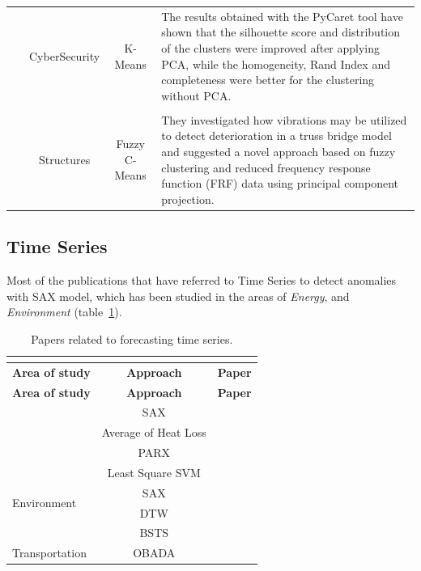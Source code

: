 \documentclass[a4paper,12pt,twoside]{ThesisStyle}
\begin{document}
\begin{landscape}
\begin{longtable}{  l  c  c  l  }
\\
\parbox{2.65cm}{~\cite{karanfilovska2022analysis}}  & CyberSecurity & K-Means & \parbox{12.5cm}{The results obtained with the PyCaret tool have shown that the silhouette score and distribution of the clusters were improved after applying PCA, while the homogeneity, Rand Index and completeness were better for the clustering without PCA.} \\
\\
\parbox{1cm}{~\cite{Zinno2022bridges}}  & Structures & Fuzzy C-Means & \parbox{12.5cm}{They investigated how vibrations may be utilized to detect deterioration in a truss bridge model and suggested a novel approach based on fuzzy clustering and reduced frequency response function (FRF) data using principal component projection.} \\
\hline
\end{longtable}
\end{landscape}

\subsection{Time Series}

Most of the publications that have referred to Time Series to detect anomalies with SAX model, which has been studied in the areas of \textit{Energy}, and \textit{Environment} (table~\ref{taula:PTSP}). 

\renewcommand{\arraystretch}{1.5}
\begin{longtable}{  l  c  l  }
\caption{Papers related to forecasting time series.}  \\
\label{taula:PTSP}  \\
\hline
  \textbf{Area of study} & \textbf{Approach} & \textbf{Paper} \\
\hline 
\endfirsthead
 \hline
  \textbf{Area of study} & \textbf{Approach} & \textbf{Paper} \\
\hline 
\endhead
\hline
\endfoot
\multirow{3}{*}{Energy}  & SAX & ~\cite{fonseca2017unsupervised}  \\
 \cline{2-3} 
& Average of Heat Loss & ~\cite{gerrish2017analysis}  \\
 \cline{2-3} 
 & PARX & ~\cite{liu2018scalable}  \\
\hline
\multirow{4}{*}{Environment} & Least Square SVM  & ~\cite{vijai2016design}  \\
\cline{2-3} 
 & SAX & ~\cite{Carbone2017heating}  \\
 \cline{2-3} 
 & DTW  & ~\cite{bachechi2022big}  \\
 \cline{2-3} 
 & BSTS  & ~\cite{wu2023gtfs}  \\
\hline
Transportation & OBADA  & ~\cite{Bawaneh2019traffic}  \\
\end{longtable}
\end{document}
